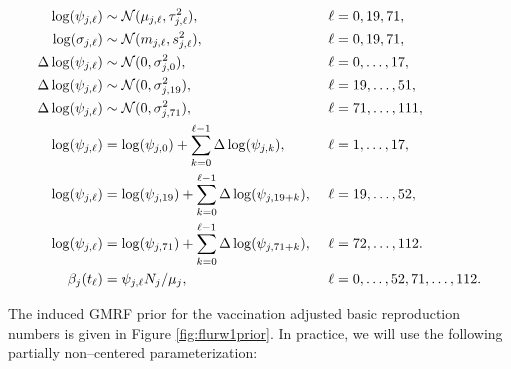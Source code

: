 \begin{footnotesize}
	\begin{align}
	\log(\psi_{j,\ell}) &\sim \mcN(\mu_{j,\ell},\tau_{j,\ell}^2),&\ &\ell= 0,19,71, \nonumber\\
	\log(\sigma_{j,\ell}) &\sim \mcN(m_{j,\ell}, s_{j,\ell}^2),&\ &\ell=0,19,71, \nonumber\\
	\Delta\log(\psi_{j,\ell})&\sim \mcN(0, \sigma^2_{j,0}),&\ &\ell=0,\dots,17, \nonumber\\
	\Delta\log(\psi_{j,\ell})&\sim \mcN(0, \sigma^2_{j,19}),&\ &\ell=19,\dots,51, \nonumber\\
	\Delta\log(\psi_{j,\ell})&\sim \mcN(0, \sigma^2_{j,71}),&\ &\ell=71,\dots,111, \nonumber\\
	\log(\psi_{j,\ell}) &= \log(\psi_{j,0}) + \sum_{k=0}^{\ell-1}\Delta\log(\psi_{j,k}),&\ &\ell = 1,\dots,17, \nonumber\\
	\log(\psi_{j,\ell}) &= \log(\psi_{j,19}) + \sum_{k=0}^{\ell-1}\Delta\log(\psi_{j,19+k}),&\ &\ell = 19,\dots,52, \nonumber\\
	\log(\psi_{j,\ell}) &= \log(\psi_{j,71}) + \sum_{k=0}^{\ell-1}\Delta\log(\psi_{j,71+k}),&\ &\ell = 72,\dots,112. \nonumber \\
	\beta_j(t_\ell) &= \psi_{j,\ell}N_j/\mu_{j},&\ &\ell=0,\dots,52,71,\dots,112. \nonumber
	\end{align}
\end{footnotesize}
The induced GMRF prior for the vaccination adjusted basic reproduction numbers is given in Figure \ref{fig:flurw1prior}. In practice, we will use the following partially non--centered parameterization:
